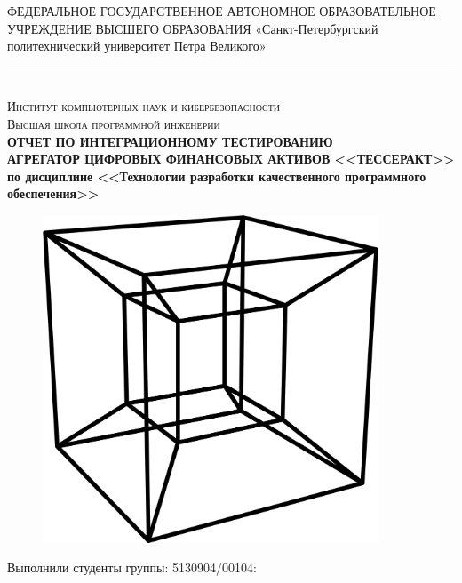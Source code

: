 \documentclass[a4paper, 14pt]{article}
\begin{document}
\begin{titlepage}
    \center

    ФЕДЕРАЛЬНОЕ ГОСУДАРСТВЕННОЕ АВТОНОМНОЕ ОБРАЗОВАТЕЛЬНОЕ УЧРЕЖДЕНИЕ ВЫСШЕГО ОБРАЗОВАНИЯ\linebreak
    «Санкт-Петербургский политехнический университет Петра Великого»
    \noindent\rule{500pt}{0.8pt} \\
    \textsc{\Large Институт компьютерных наук и кибербезопасности}\\
    \textsc{\large Высшая школа программной инженерии}\\[1.5cm]

    { \huge \bfseries ОТЧЕТ ПО ИНТЕГРАЦИОННОМУ ТЕСТИРОВАНИЮ	\\
    \Large \mdseries АГРЕГАТОР ЦИФРОВЫХ ФИНАНСОВЫХ АКТИВОВ <<ТЕССЕРАКТ>> \\
    \large по дисциплине <<Технологии разработки качественного программного обеспечения>>}\\
    \flushright{
        {\phantom{qwe}}\\[1.0cm]
    }

    \begin{figure}[H]
        \centering
        \includegraphics[width=10cm]{./resources/1.png}\\[2.0cm]
    \end{figure}

    \begin{multicols}{2}
        \begin{flushright} \large

            {Выполнили студенты группы: 5130904/00104:}\\
            {\phantom{qwe}}\\
            {\phantom{qwe}}\\
            {\phantom{qwe}}\\
            {\phantom{qwe}}\\


\end{flushright}
\end{multicols}
\end{titlepage}
\end{document}
